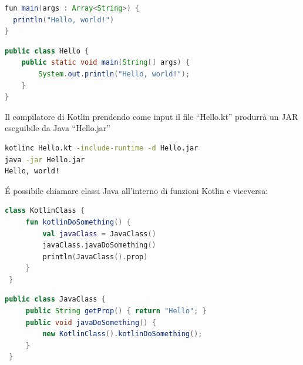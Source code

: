 \begin{lstlisting}[language=java,caption={Hello World in Kotlin}]
fun main(args : Array<String>) {
  println("Hello, world!")
}
\end{lstlisting}

\begin{lstlisting}[language=java,caption={Hello World in Java}]
public class Hello {
    public static void main(String[] args) {
        System.out.println("Hello, world!");
    }
}
\end{lstlisting}

Il compilatore di Kotlin prendendo come input il file ``Hello.kt'' produrrà un JAR eseguibile da Java ``Hello.jar''

\begin{lstlisting}[language=bash,caption={Compilazione di un programma Kotlin}]
kotlinc Hello.kt -include-runtime -d Hello.jar
java -jar Hello.jar
Hello, world!
\end{lstlisting}

\'E possibile chiamare classi Java all'interno di funzioni Kotlin e viceversa:
\begin{lstlisting}[language=Kotlin,caption={Chiamare Java da Kotlin}]
 class KotlinClass {
     fun kotlinDoSomething() {
         val javaClass = JavaClass()
         javaClass.javaDoSomething()
         println(JavaClass().prop)
     }
 }
 \end{lstlisting}

 \begin{lstlisting}[language=java,caption={Chiamare Kotlin da Java}]
 public class JavaClass {
     public String getProp() { return "Hello"; }
     public void javaDoSomething() {
         new KotlinClass().kotlinDoSomething();
     }
 }
 \end{lstlisting}

